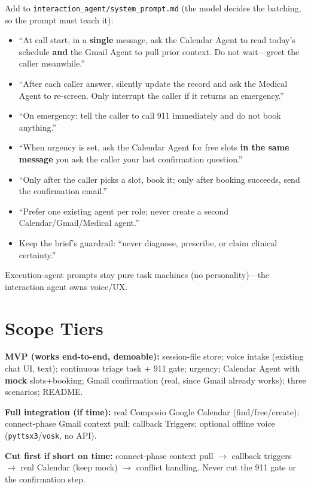 \documentclass[11pt,a4paper]{article}
\begin{document}
Add to \texttt{interaction\_agent/system\_prompt.md} (the model decides the batching, so the prompt must teach
it):

\begin{itemize}[leftmargin=*]
  \item ``At call start, in a \textbf{single} message, ask the Calendar Agent to read today's schedule
  \textbf{and} the Gmail Agent to pull prior context. Do not wait---greet the caller meanwhile.''
  \item ``After each caller answer, silently update the record and ask the Medical Agent to re-screen. Only
  interrupt the caller if it returns an emergency.''
  \item ``On emergency: tell the caller to call 911 immediately and do not book anything.''
  \item ``When urgency is set, ask the Calendar Agent for free slots \textbf{in the same message} you ask the
  caller your last confirmation question.''
  \item ``Only after the caller picks a slot, book it; only after booking succeeds, send the confirmation email.''
  \item ``Prefer one existing agent per role; never create a second Calendar/Gmail/Medical agent.''
  \item Keep the brief's guardrail: ``never diagnose, prescribe, or claim clinical certainty.''
\end{itemize}

\noindent Execution-agent prompts stay pure task machines (no personality)---the interaction agent owns voice/UX.

\section{Scope Tiers}

\textbf{MVP (works end-to-end, demoable):} session-file store; voice intake (existing chat UI, text);
continuous triage task + 911 gate; urgency; Calendar Agent with \textbf{mock} slots+booking; Gmail confirmation
(real, since Gmail already works); three scenarios; README.

\textbf{Full integration (if time):} real Composio Google Calendar (find/free/create); connect-phase Gmail
context pull; callback Triggers; optional offline voice (\texttt{pyttsx3}/\texttt{vosk}, no API).

\textbf{Cut first if short on time:} connect-phase context pull $\rightarrow$ callback triggers $\rightarrow$
real Calendar (keep mock) $\rightarrow$ conflict handling. Never cut the 911 gate or the confirmation step.
\end{document}

